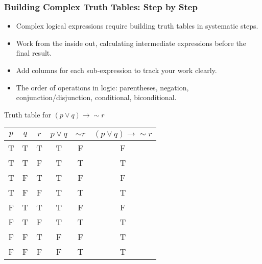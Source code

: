 \documentclass{beamer}
\begin{document}
                    \begin{frame}
                        \frametitle{Building Complex Truth Tables: Step by Step}
                        \begin{itemize}
                            \item Complex logical expressions require building truth tables in systematic steps.
                            \item Work from the inside out, calculating intermediate expressions before the final result.
                            \item Add columns for each sub-expression to track your work clearly.
                            \item The order of operations in logic: parentheses, negation, conjunction/disjunction, conditional, biconditional.
                        \end{itemize}
                        
                        \begin{example}
                            \scriptsize
                        Truth table for $(p \vee q) \rightarrow \sim r$\\[0.2cm]
                        \begin{tabular}{|c|c|c|c|c|c|}
                        \hline
                        $p$ & $q$ & $r$ & $p \vee q$ & $\sim r$ & $(p \vee q) \rightarrow \sim r$ \\
                        \hline
                        T & T & T & T & F & F \\
                        \hline
                        T & T & F & T & T & T \\
                        \hline
                        T & F & T & T & F & F \\
                        \hline
                        T & F & F & T & T & T \\
                        \hline
                        F & T & T & T & F & F \\
                        \hline
                        F & T & F & T & T & T \\
                        \hline
                        F & F & T & F & F & T \\
                        \hline
                        F & F & F & F & T & T \\
                        \hline
                        \end{tabular}
                        \end{example}
                        \end{frame}
                        
\end{document}

